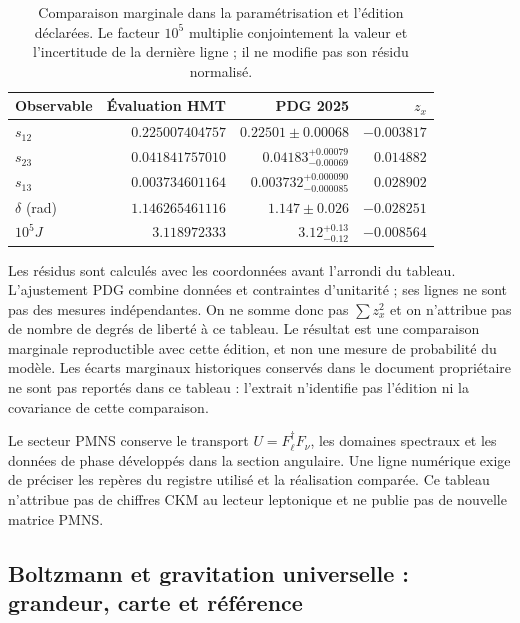 \begin{table}[htbp]
\centering\small
\setlength{\tabcolsep}{4pt}
\begin{tabular}{@{}lrrr@{}}
\toprule
Observable & Évaluation HMT & PDG 2025 & \(z_x\)\\
\midrule
\(s_{12}\) & \(0.225007404757\) & \(0.22501\pm0.00068\) & \(-0.003817\)\\
\(s_{23}\) & \(0.041841757010\) & \(0.04183^{+0.00079}_{-0.00069}\) & \(0.014882\)\\
\(s_{13}\) & \(0.003734601164\) & \(0.003732^{+0.000090}_{-0.000085}\) & \(0.028902\)\\
\(\delta\) (rad) & \(1.146265461116\) & \(1.147\pm0.026\) & \(-0.028251\)\\
\(10^5J\) & \(3.118972333\) & \(3.12^{+0.13}_{-0.12}\) & \(-0.008564\)\\
\bottomrule
\end{tabular}
\caption{Comparaison marginale dans la paramétrisation et l’édition déclarées.
Le facteur \(10^5\) multiplie conjointement la valeur et l’incertitude de la
dernière ligne ; il ne modifie pas son résidu normalisé.}
\label{ii:tab:ii-ckm-comparacion}
\end{table}

Les résidus sont calculés avec les coordonnées avant l’arrondi
du tableau. L’ajustement PDG combine données et contraintes d’unitarité ;
ses lignes ne sont pas des mesures indépendantes. On ne somme donc pas
\(\sum z_x^2\) et on n’attribue pas de nombre de degrés de liberté à ce tableau.
Le résultat est une comparaison marginale reproductible avec cette édition,
et non une mesure de probabilité du modèle. Les écarts marginaux
historiques conservés dans le document propriétaire ne sont pas reportés dans ce tableau :
l’extrait n’identifie pas l’édition ni la covariance de cette comparaison.

Le secteur PMNS conserve le transport \(U=F_\ell^\dagger F_\nu\), les
domaines spectraux et les données de phase développés dans la section
angulaire. Une ligne numérique exige de préciser les repères du registre
utilisé et la réalisation comparée. Ce tableau n’attribue pas de chiffres CKM
au lecteur leptonique et ne publie pas de nouvelle matrice PMNS.

\subsection{Boltzmann et gravitation universelle : grandeur, carte et référence}

